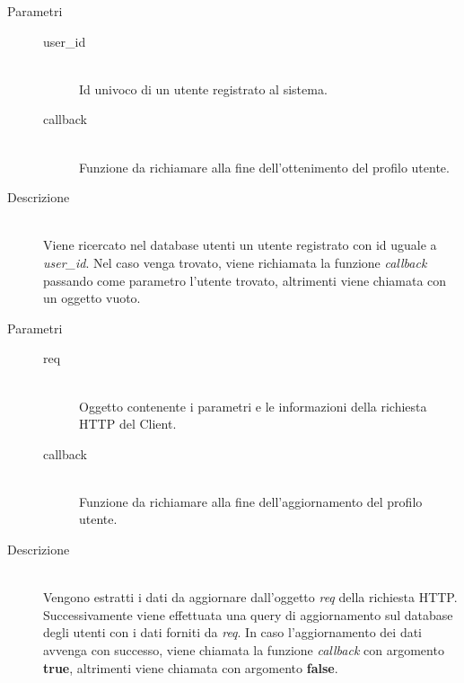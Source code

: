 \begin{description}
\begin{mldescription}
 		 \hfill
 			\begin{description}
 				\item[Parametri] \hfill
 					\begin{description}
 						\item[user\_id] \hfill \\
 							Id univoco di un utente registrato al sistema.
 						\item[callback] \hfill \\
 							Funzione da richiamare alla fine dell'ottenimento del profilo utente.
 					\end{description}
 				\item[Descrizione] \hfill \\
 					Viene ricercato nel database utenti un utente registrato con id uguale a 	\textit{user\_id}. Nel caso venga trovato, viene richiamata la funzione \textit{callback}	passando come parametro l'utente trovato, altrimenti viene chiamata con un oggetto vuoto.
 			\end{description}
 			
 		 \hfill
 			\begin{description}
 				\item[Parametri] \hfill
 					\begin{description}
 						\item[req] \hfill \\
 							Oggetto contenente i parametri e le informazioni della richiesta HTTP del Client.
 						\item[callback] \hfill \\
 							Funzione da richiamare alla fine dell'aggiornamento del profilo utente.
 					\end{description}
 				\item[Descrizione] \hfill \\
 					Vengono estratti i dati da aggiornare dall'oggetto \textit{req} della richiesta HTTP. Successivamente viene effettuata una query di aggiornamento sul database degli utenti con i dati forniti da \textit{req}. In caso l'aggiornamento dei dati avvenga con successo, 	viene chiamata la funzione \textit{callback} con argomento \textbf{true}, altrimenti viene chiamata con argomento \textbf{false}.  
 			\end{description}
 			

\end{mldescription}
\end{description}
